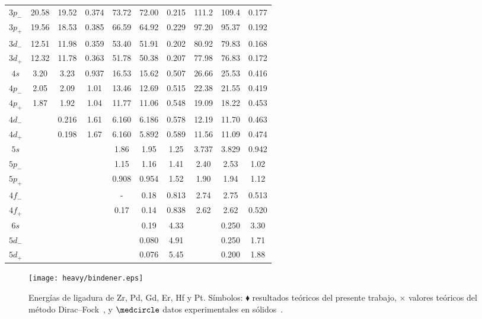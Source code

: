 \begin{longtable}{|c|ccc|ccc|ccc|}
$3p_-$ & 20.58  & 19.52  & 0.374  & 73.72  & 72.00  & 0.215  & 111.2  & 109.4  & 0.177 \\
$3p_+$ & 19.56  & 18.53  & 0.385  & 66.59  & 64.92  & 0.229  & 97.20  & 95.37  & 0.192 \\
$3d_-$ & 12.51  & 11.98  & 0.359  & 53.40  & 51.91  & 0.202  & 80.92  & 79.83  & 0.168 \\
$3d_+$ & 12.32  & 11.78  & 0.363  & 51.78  & 50.38  & 0.207  & 77.98  & 76.83  & 0.172 \\
$4s$   & 3.20   & 3.23   & 0.937  & 16.53  & 15.62  & 0.507  & 26.66  & 25.53  & 0.416 \\
$4p_-$ & 2.05   & 2.09   & 1.01   & 13.46  & 12.69  & 0.515  & 22.38  & 21.55  & 0.419 \\
$4p_+$ & 1.87   & 1.92   & 1.04   & 11.77  & 11.06  & 0.548  & 19.09  & 18.22  & 0.453 \\
$4d_-$ &        & 0.216  & 1.61   & 6.160  & 6.186  & 0.578  & 12.19  & 11.70  & 0.463 \\
$4d_+$ &        & 0.198  & 1.67   & 6.160  & 5.892  & 0.589  & 11.56  & 11.09  & 0.474 \\
$5s$   &        &        &        & 1.86   & 1.95   & 1.25   & 3.737  & 3.829  & 0.942 \\
$5p_-$ &        &        &        & 1.15   & 1.16   & 1.41   & 2.40   & 2.53   & 1.02 \\
$5p_+$ &        &        &        & 0.908  & 0.954  & 1.52   & 1.90   & 1.94   & 1.12 \\
$4f_-$ &        &        &        & -      & 0.18   & 0.813  & 2.74   & 2.75   & 0.513 \\
$4f_+$ &        &        &        & 0.17   & 0.14   & 0.838  & 2.62   & 2.62   & 0.520 \\
$6s$   &        &        &        &        & 0.19   & 4.33   &        & 0.250  & 3.30 \\
$5d_-$ &        &        &        &        & 0.080  & 4.91   &        & 0.250  & 1.71 \\
$5d_+$ &        &        &        &        & 0.076  & 5.45   &        & 0.200  & 1.88 \\
 \hline
\end{longtable}

\begin{figure}[H]
\centering
\texttt{[image: heavy/bindener.eps]}
\caption[Energías de ligadura de blancos relativistas]
{Energías de ligadura de Zr, Pd, Gd, Er, Hf y Pt. Símbolos: 
$\blacklozenge$ resultados teóricos del presente trabajo, 
$\times$ valores teóricos del método Dirac--Fock~\cite{Desclaux:73}, y 
$\medcircle$ datos experimentales en sólidos~\cite{Williams:95}.}
\label{fig:bindener}
\end{figure}


